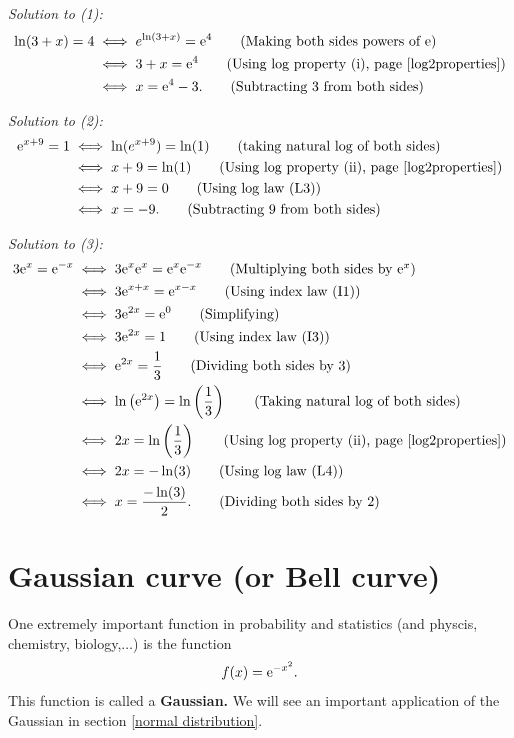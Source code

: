 \noindent \textit{Solution to (1):} \\
\begin{align*}
\ln(3 + x) = 4 & \iff e^{\ln(3 + x)} = \e^4 \tag{Making both sides powers of $\e$} \\
			& \iff 3 + x = \e^4 \tag{Using log property (i), page \pageref{log2properties}} \\
			& \iff x = \e^4 - 3. \tag{Subtracting 3 from both sides}
\end{align*}
\bigskip

\noindent \textit{Solution to (2):} \\
\begin{align*}
\e^{x + 9} = 1 & \iff \ln(e^{x + 9}) = \ln(1) \tag{taking natural log of both sides} \\
			& \iff x + 9 = \ln(1) \tag{Using log property (ii), page \pageref{log2properties}} \\
			& \iff x + 9 = 0 \tag{Using log law (L3)} \\
			& \iff x = -9. \tag{Subtracting 9 from both sides}
\end{align*}

\noindent \textit{Solution to (3):} \\
\begin{align*}
3\e^x = \e^{-x} & \iff 3\e^x\e^x = \e^x\e^{-x} \tag{Multiplying both sides by $\e^x$} \\
			   & \iff 3\e^{x + x} = \e^{x - x} \tag{Using index law (I1)} \\ \bigskip
			   & \iff 3\e^{2x} = \e^0 \tag{Simplifying} \\
			   & \iff 3\e^{2x} = 1 \tag{Using index law (I3)} \\
			   & \iff \e^{2x} = \frac{1}{3} \tag{Dividing both sides by $3$} \\
			   & \iff \ln\brac{\e^{2x}} = \ln\brac{\frac{1}{3}} \tag{Taking natural log of both sides} \\
			   & \iff 2x = \ln\brac{\frac{1}{3}} \tag{Using log property (ii), page \pageref{log2properties}} \\
			   & \iff 2x = -\ln(3) \tag{Using log law (L4)} \\
			   & \iff x = \frac{-\ln(3)}{2}. \tag{Dividing both sides by 2}
\end{align*}

\section{Gaussian curve (or Bell curve)} \label{gaussian curve} \label{bell curve}
One extremely important function in probability and statistics (and physcis, chemistry, biology,$\ldots$) is the function
\[
f(x) = \mathrm{e}^{-x^2}.
\]
This function is called a \textbf{Gaussian.} We will see an important application of the Gaussian in section \ref{normal distribution}. \\


